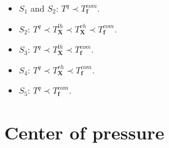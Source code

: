 \documentclass[12pt,a4paper,twoside]{article}
\begin{document}
\begin{itemize}
\item $S_1$ and $S_2$: $T^q \prec T^{com}_{\bm f}$.
\item $S_2$: $T^q \prec T^{lh}_{\bm X}  \prec  T^{rh}_{\bm X} \prec T^{com}_{\bm f} $.
\item $S_3$: $T^q \prec T^{lh}_{\bm X}  \prec T^{com}_{\bm f} $.
\item $S_4$: $T^q \prec T^{rh}_{\bm X}  \prec T^{com}_{\bm f} $.
\item $S_5$: $T^q \prec T^{com}_{\bm f} $.
\end{itemize}




\newpage \appendix

\section{Center of pressure}
\end{document}
